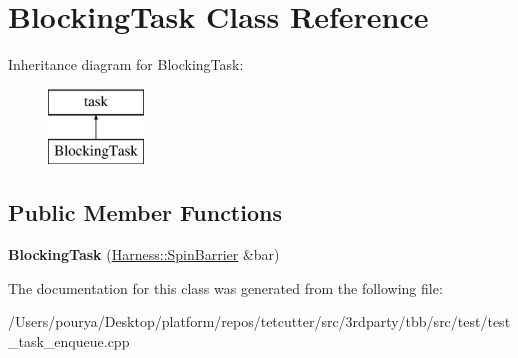\hypertarget{classBlockingTask}{}\section{Blocking\+Task Class Reference}
\label{classBlockingTask}
Inheritance diagram for Blocking\+Task\+:\begin{figure}[H]
\begin{center}
\leavevmode
\includegraphics[height=2.000000cm]{classBlockingTask}
\end{center}
\end{figure}
\subsection*{Public Member Functions}
\begin{DoxyCompactItemize}
\item 
\hypertarget{classBlockingTask_ad3fe57990f592f55b3392c195b4feff9}{}{\bfseries Blocking\+Task} (\hyperlink{classHarness_1_1SpinBarrier}{Harness\+::\+Spin\+Barrier} \&bar)\label{classBlockingTask_ad3fe57990f592f55b3392c195b4feff9}

\end{DoxyCompactItemize}


The documentation for this class was generated from the following file\+:\begin{DoxyCompactItemize}
\item 
/\+Users/pourya/\+Desktop/platform/repos/tetcutter/src/3rdparty/tbb/src/test/test\+\_\+task\+\_\+enqueue.\+cpp\end{DoxyCompactItemize}
